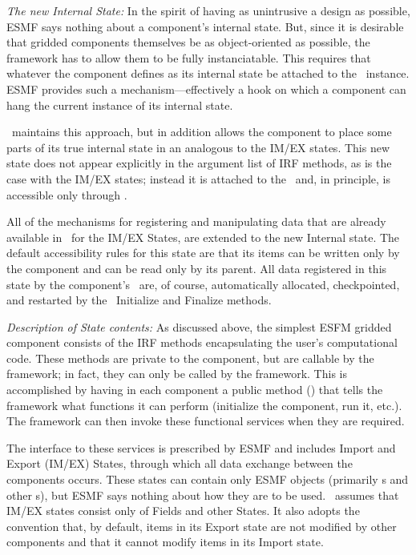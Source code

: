 {\em The new Internal State:}
In the spirit of having as unintrusive a design as possible, ESMF says
nothing about a component's internal state. But, since
it is desirable that gridded components themselves be as
object-oriented as possible, the framework has to allow them to be fully
instanciatable. This requires that whatever the component defines as
its internal state be attached to the \egc\ 
instance. ESMF provides such a mechanism---effectively a hook on which
a component can hang the current instance of its internal state.

\ggn\   maintains this approach, but in addition allows the
component to place some parts of its true internal state in an \stt
analogous to the IM/EX states. This new state
does not appear explicitly in the argument
list of IRF methods, as is the case with
the IM/EX states; instead it is attached to the \egc\  and, in
principle, is accessible only through \ggn.

All of the mechanisms for registering and manipulating data that are
already available in \ggn\  for the IM/EX States, are
extended to the new Internal state. The default accessibility rules
for this state are that its items can be written only by the component
and can be read only by its parent. All data registered in this state
by the component's \ssv\  are, of course, automatically
allocated, checkpointed, and restarted by the \ggn\   Initialize and Finalize
methods.



{\em Description of State contents:} 
As discussed above, the simplest ESFM gridded component consists of the
IRF methods encapsulating the user's computational code. These
methods are private to the component, but are callable by the
framework; in fact, they can only be called by the framework. This
is accomplished by having in each component a public method
(\ssv) that tells the framework what functions it can perform
(initialize the component, run it, etc.). The framework can then
invoke these functional services when they are required.


The interface to these services is prescribed by ESMF and includes
Import and Export (IM/EX) States, through which all data exchange
between the components occurs. These states can contain only ESMF
objects (primarily \fld s and other \stt s), but ESMF says
nothing about how they are to be used.  \ggn\   assumes that
IM/EX states consist only of Fields and other States. It also adopts
the convention that, by default, items in its Export state are not
modified by other components and that it cannot modify items in its
Import state.


